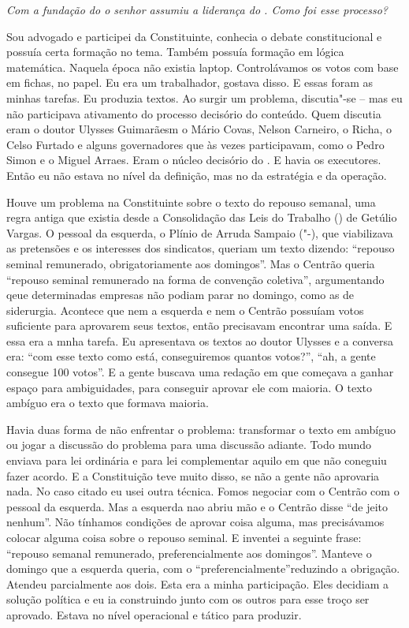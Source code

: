 \medskip

\emph{Com a fundação do  o senhor assumiu a liderança do . Como foi
esse processo?}

Sou advogado e participei da Constituinte, conhecia o
debate constitucional e possuía certa formação no tema. Também possuía
formação em lógica matemática. Naquela época não existia laptop.
Controlávamos os votos com base em fichas, no papel. Eu era um
trabalhador, gostava disso. E essas foram as minhas tarefas. Eu produzia
textos. Ao surgir um problema, discutia"-se -- mas eu não participava
ativamento do processo decisório do conteúdo. Quem discutia eram o
doutor Ulysses Guimarãesm o Mário Covas, Nelson Carneiro, o Richa, o
Celso Furtado e alguns governadores que às vezes participavam, como o
Pedro Simon e o Miguel Arraes. Eram o núcleo decisório do . E havia
os executores. Então eu não estava no nível da definição, mas no da
estratégia e da operação.

Houve um problema na Constituinte sobre o texto do repouso semanal, uma
regra antiga que existia desde a Consolidação das Leis do Trabalho ()
de Getúlio Vargas. O pessoal da esquerda, o Plínio de Arruda Sampaio
("-), que viabilizava as pretensões e os interesses dos sindicatos,
queriam um texto dizendo: ``repouso seminal remunerado, obrigatoriamente
aos domingos''. Mas o Centrão queria ``repouso seminal remunerado na
forma de convenção coletiva'', argumentando qeue determinadas empresas
não podiam parar no domingo, como as de siderurgia. Acontece que nem a
esquerda e nem o Centrão possuíam votos suficiente para aprovarem seus
textos, então precisavam encontrar uma saída. E essa era a mnha tarefa.
Eu apresentava os textos ao doutor Ulysses e a conversa era: ``com esse
texto como está, conseguiremos quantos votos?'', ``ah, a gente consegue
100 votos''. E a gente buscava uma redação em que começava a ganhar
espaço para ambiguidades, para conseguir aprovar ele com maioria. O
texto ambíguo era o texto que formava maioria.

Havia duas forma de não enfrentar o problema: transformar o texto em
ambíguo ou jogar a discussão do problema para uma discussão adiante.
Todo mundo enviava para lei ordinária e para lei complementar aquilo em
que não coneguiu fazer acordo. E a Constituição teve muito disso, se não
a gente não aprovaria nada. No caso citado eu usei outra técnica. Fomos
negociar com o Centrão com o pessoal da esquerda. Mas a esquerda nao
abriu mão e o Centrão disse ``de jeito nenhum''. Não tínhamos condições
de aprovar coisa alguma, mas precisávamos colocar alguma coisa sobre o
repouso seminal. E inventei a seguinte frase: ``repouso semanal
remunerado, preferencialmente aos domingos''. Manteve o domingo que a
esquerda queria, com o ``preferencialmente''reduzindo a obrigação.
Atendeu parcialmente aos dois. Esta era a minha participação. Eles
decidiam a solução política e eu ia construindo junto com os outros para
esse troço ser aprovado. Estava no nível operacional e tático para
produzir.

